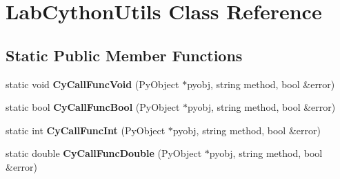\hypertarget{class_lab_cython_utils}{\section{Lab\+Cython\+Utils Class Reference}
\label{class_lab_cython_utils}
}
\subsection*{Static Public Member Functions}
\begin{DoxyCompactItemize}
\item 
\hypertarget{class_lab_cython_utils_a3bbb4ec782386d8f500176aabf8036ed}{static void {\bfseries Cy\+Call\+Func\+Void} (Py\+Object $\ast$pyobj, string method, bool \&error)}\label{class_lab_cython_utils_a3bbb4ec782386d8f500176aabf8036ed}

\item 
\hypertarget{class_lab_cython_utils_a64a831e079e8c2b21ae71303864d4f01}{static bool {\bfseries Cy\+Call\+Func\+Bool} (Py\+Object $\ast$pyobj, string method, bool \&error)}\label{class_lab_cython_utils_a64a831e079e8c2b21ae71303864d4f01}

\item 
\hypertarget{class_lab_cython_utils_accf885a7ef884b2d7023217a365a3cff}{static int {\bfseries Cy\+Call\+Func\+Int} (Py\+Object $\ast$pyobj, string method, bool \&error)}\label{class_lab_cython_utils_accf885a7ef884b2d7023217a365a3cff}

\item 
\hypertarget{class_lab_cython_utils_a4d41409ede576a7a2e147f560b41a7f1}{static double {\bfseries Cy\+Call\+Func\+Double} (Py\+Object $\ast$pyobj, string method, bool \&error)}\label{class_lab_cython_utils_a4d41409ede576a7a2e147f560b41a7f1}

\end{DoxyCompactItemize}
